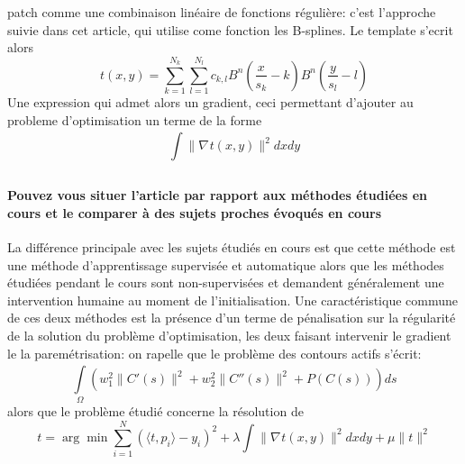 \documentclass{article}
\begin{document}
\begin{itemize}
        patch comme une combinaison linéaire de fonctions régulière: c'est l'approche
        suivie dans cet article, qui utilise come fonction les B-splines. Le template
        s'ecrit alors
        \[
            t(x, y) = \sum\limits_{ k=1 }^{ N_k } \sum\limits_{ l=1 }^{ N_l } c_{k, l} B^n \left (
            \frac{x}{s_k} - k \right ) B^n \left ( \frac{y}{s_{l}} - l \right )
            \label{eq:spline} \tag{1}
        \] 
        Une expression qui admet alors un gradient, ceci permettant d'ajouter au
        probleme d'optimisation un terme de la forme
        \[
            \int\limits_{  }^{  } \| \nabla_{  } t(x, y) \|^2 dx dy
        \] 
\end{itemize}

\paragraph{Pouvez vous situer l'article par rapport aux méthodes étudiées en cours et le
comparer à des sujets proches évoqués en cours} 
La différence principale avec les sujets étudiés en cours est que cette méthode est une
méthode d'apprentissage supervisée et automatique alors que les méthodes étudiées
pendant le cours sont non-supervisées et demandent généralement une intervention humaine
au moment de l'initialisation.\newline
Une caractéristique commune de ces deux méthodes est la présence d'un terme de
pénalisation sur la régularité de la solution du problème d'optimisation, les deux
faisant intervenir le gradient le la paremétrisation: on rapelle que le problème des
contours actifs s'écrit:
\[
    \int\limits_{  \Omega }^{  } \left ( w_1^2 \|C'(s)\|^2 + w_2^2 \|C''(s)\|^2 +
    P(C(s)) \right )ds
\] 
alors que le problème étudié concerne la résolution de 
\[
    t = \arg \min_{  } \sum\limits_{ i=1 }^{ N } \left ( \langle t, p_i \rangle
    - y_i \right )^2 + \lambda \int\limits_{  }^{  } \| \nabla_{  } t(x, y) \|^2 dx dy + \mu \| t \|^2
    \label{eq.2} \tag{2}
\]
\end{document}
